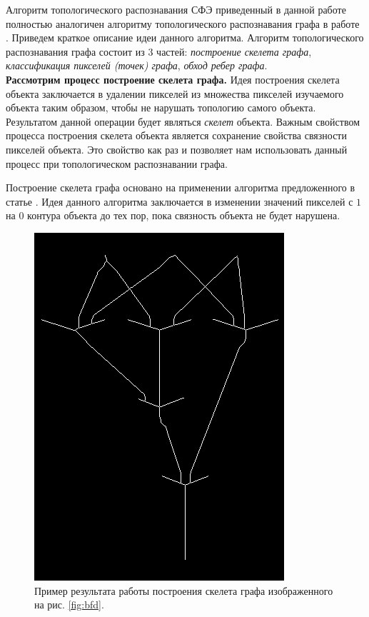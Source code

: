 \documentclass[makeidx, a4paper, 14pt]{extarticle}
\begin{document}
Алгоритм топологического распознавания СФЭ приведенный в данной работе полностью аналогичен алгоритму топологического распознавания графа в работе \cite{auer13}.
Приведем краткое описание идеи данного алгоритма. Алгоритм топологического распознавания графа состоит из 3 частей: \emph{построение скелета графа}, \emph{классификация пикселей (точек) графа},
\emph{обход ребер графа}. \\

\textbf{Рассмотрим процесс построение скелета графа.} Идея построения скелета объекта заключается в удалении пикселей из множества пикселей изучаемого объекта таким образом,
чтобы не нарушать топологию самого объекта. Результатом данной операции будет являться \emph{скелет} объекта.
Важным свойством процесса построения скелета объекта является сохранение свойства связности пикселей объекта. Это свойство
как раз и позволяет нам использовать данный процесс при топологическом распознавании графа.

Построение скелета графа основано на применении алгоритма предложенного в статье \cite{zhang_suen84}. Идея данного
алгоритма заключается в изменении значений пикселей с $1$ на $0$ контура объекта до тех пор, пока связность объекта не будет нарушена.

\begin{figure}[H]
    \centering
    \includegraphics[scale=0.75]{img4_skelet.png}
    \caption{Пример результата работы построения скелета графа изображенного на рис. \ref{fig:bfd}.}
\end{figure}
\end{document}
